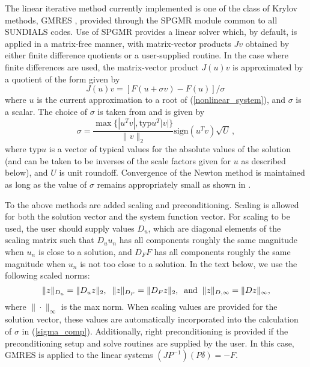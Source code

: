 The linear iterative method currently implemented is one of the
class of Krylov methods, GMRES \cite{BrHi:89,SaSc:86}, provided
through the SPGMR module common to all SUNDIALS codes. Use of
SPGMR provides a linear solver which, by default, is applied in a
matrix-free manner, with matrix-vector products $Jv$ obtained by
either finite difference quotients or a user-supplied routine. In
the case where finite differences are used, the matrix-vector
product $J(u)v$ is approximated by a quotient of the form given by
\begin{equation}\label{jacobv}
J(u) v = [F(u+\sigma v) - F(u)]/\sigma \,
\end{equation}
where $u$ is the current approximation to a root of
(\ref{nonlinear_system}), and $\sigma$ is a scalar. The choice of
$\sigma$ is taken from \cite{BrSa:90} and is given by
\begin{equation}\label{sigma_comp}
  \sigma = \frac{\max \{|u^T v|, \mbox{typ}u^T |v|\}}{\|v\|_2}
  \mbox{sign}(u^T v) \sqrt{U} \, ,
\end{equation}
where $\mbox{typ}u$ is a vector of typical values for the absolute
values of the solution (and can be taken to be inverses of the
scale factors given for $u$ as described below), and $U$ is unit
roundoff. Convergence of the Newton method is maintained as long
as the value of $\sigma$ remains appropriately small as shown in
\cite{Bro:87}.

To the above methods are added scaling and preconditioning.
Scaling is allowed for both the solution vector and the system
function vector. For scaling to be used, the user should supply
values $D_u$, which are diagonal elements of the scaling matrix
such that $D_u u_n$ has all components roughly the same magnitude
when $u_n$ is close to a solution, and $D_F F$ has all components
roughly the same magnitude when $u_n$ is not too close to a
solution. In the text below, we use the following scaled norms:
\begin{equation}
\|z\|_{D_u} = \|D_u z\|_2, \;\; \|z\|_{D_F} = \|D_F z\|_2, \;\;
{\rm and} \;\; \|z\|_{D,\infty} = \|Dz\|_{\infty},
\end{equation}
where $\| \cdot \|_{\infty}$ is the max norm.  When scaling values
are provided for the solution vector, these values are
automatically incorporated into the calculation of $\sigma$ in
(\ref{sigma_comp}). Additionally, right preconditioning is
provided if the preconditioning setup and solve routines are
supplied by the user. In this case, GMRES is applied to the linear
systems $(JP^{-1})(P\delta) = -F$.

